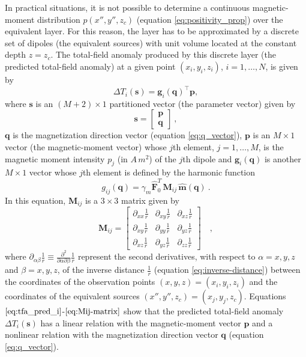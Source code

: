 In practical situations, it is not possible to determine a continuous magnetic-moment
distribution $p(x'',y'',z_{c})$ (equation \ref{eq:positivity_prop}) over the 
equivalent layer. 
For this reason, the layer has to be approximated by a discrete set of dipoles 
(the equivalent sources) with unit volume located at the constant depth $z = z_c$.
The total-field anomaly produced by this discrete layer (the predicted total-field anomaly) 
at a given point $(x_{i}, y_{i}, z_{i})$, $i = 1, \dots, N$, is given by
\begin{equation}
\Delta T_{i}(\mathbf{s}) = \mathbf{g}_{i}(\mathbf{q})^{\top} \mathbf{p},
\label{eq:tfa_pred_i}
\end{equation}
where $\mathbf{s}$ is an $(M + 2) \times 1$ partitioned vector (the parameter vector) given by 
\begin{equation}
	\mathbf{s} = \begin{bmatrix}
		\mathbf{p} \\
		\mathbf{q}
	\end{bmatrix} \: ,
	\label{eq:parameter-vector}
\end{equation}
$\mathbf{q}$ is the magnetization direction vector (equation \ref{eq:q_vector}), $\mathbf{p}$ is an 
$M \times 1$ vector (the magnetic-moment vector) whose $j$th element, $j = 1, \dots, M$, is the 
magnetic moment intensity $p_{j}$ (in $A \, m^{2}$) of the $j$th dipole and 
$\mathbf{g}_{i} (\mathbf{q})$ is another $M \times 1$ vector whose $j$th element is defined 
by the harmonic function
\begin{equation}
g_{ij} (\mathbf{q})  = \gamma_m \hat{\mathbf{F}}_{0}^T \, 
\mathbf{M}_{ij} \, \hat{\mathbf{m}}(\mathbf{q}) \: .
\label{eq:g_ij}
\end{equation}
In this equation, $\mathbf{M}_{ij}$ is a $3 \times 3$ matrix given by
\begin{equation}
\mathbf{M}_{ij} = \begin{bmatrix}
\partial_{xx} \frac{1}{r} & 
\partial_{xy} \frac{1}{r} &
\partial_{xz} \frac{1}{r} \\
\partial_{xy} \frac{1}{r} & 
\partial_{yy} \frac{1}{r} &
\partial_{yz} \frac{1}{r} \\
\partial_{xz} \frac{1}{r} & 
\partial_{yz} \frac{1}{r} &
\partial_{zz} \frac{1}{r}
\end{bmatrix} \quad ,
\label{eq:Mij-matrix}
\end{equation}
where $\partial_{\alpha\beta} \frac{1}{r} \equiv 
\frac{\partial^{2}}{\partial \alpha \partial \beta} \frac{1}{r}$ 
represent the second derivatives,
with respect to $\alpha = x, y, z$ and $\beta = x, y, z$, of the inverse distance 
$\frac{1}{r}$ (equation \ref{eq:inverse-distance}) between the coordinates of the 
observation points $(x, y, z) = (x_{i}, y_{i}, z_{i})$ and the coordinates of the 
equivalent sources $(x'', y'', z_{c}) = (x_{j}, y_{j}, z_{c})$.
Equations $\ref{eq:tfa_pred_i}$-$\ref{eq:Mij-matrix}$ show that the predicted total-field anomaly 
$\Delta T_{i}(\mathbf{s})$ has a linear relation with the magnetic-moment vector $\mathbf{p}$ 
and a nonlinear relation with the magnetization direction vector $\mathbf{q}$ 
(equation \ref{eq:q_vector}).


